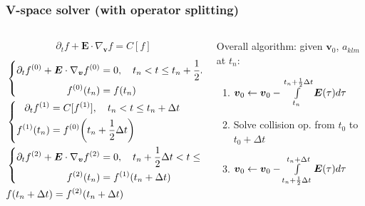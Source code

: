 \documentclass[mathserif, aspectratio=169]{beamer}
\newcommand{\vect}[1]{\boldsymbol{#1}}
\newcommand{\of}[1]{\mleft( #1 \mright)}
\newcommand{\myint}{\int\limits}
\begin{document}
\begin{frame}
\end{frame}




\begin{frame}
\frametitle{V-space solver (with operator splitting)}
\begin{columns}
	\begin{column}{0.5\textwidth}
		\begin{center}
			\small
			\begin{align*}
			\partial_t f + \vect{E}\cdot \nabla_{\vect{v}} f = C[f]
			\end{align*}
			\begin{align*}
			&\left\{
			\begin{aligned}
			\partial_t f^{(0)} + \vect{E}\cdot \nabla_{\vect{v}} f^{(0)} &= 0, \quad t_n < t \leq t_n + \frac12 \Delta t \\
			f^{(0)}\of{t_n} &= f\of{t_n}
			\end{aligned}
			\right.
			\\
			&\left\{
			\begin{aligned}
			\partial_t f^{(1)} &= C[f^{(1)}], \quad t_n < t \leq t_n + \Delta t \\
			f^{(1)}\of{t_n} &= f^{(0)}\of{t_n + \frac12 \Delta t}
			\end{aligned}
			\right.
			\\
			&\left\{
			\begin{aligned}
			\partial_t f^{(2)} + \vect{E}\cdot \nabla_{\vect{v}} f^{(2)} &= 0, \quad t_n + \frac12 \Delta t < t \leq t_n + \Delta t  \\
			f^{(2)}\of{t_n} &= f^{(1)}\of{t_n + \Delta t}
			\end{aligned}
			\right.
			\\
			& f\of{t_n + \Delta t} = f^{(2)}\of{t_n + \Delta t}
			\end{align*}
		\end{center}
	\end{column}
	\begin{column}{0.5\textwidth}  %
		\begin{center}
			Overall algorithm: given $\vect{v}_0$, $a_{klm}$ at $t_n$:
			\begin{enumerate}
				\item $\vect{v}_0 \leftarrow \vect{v}_0 - \myint_{t_n}^{t_n+\frac12 \Delta t} \vect{E}\of{\tau} d\tau$
				\item Solve collision op.  from $t_0$ to $t_0 + \Delta t$
				\item $\vect{v}_0 \leftarrow \vect{v}_0 - \myint_{t_n+\frac12 \Delta t}^{t_n + \Delta t} \vect{E}\of{\tau} d\tau$
			\end{enumerate}
		\end{center}
	\end{column}
\end{columns}
\end{frame}
\end{document}
